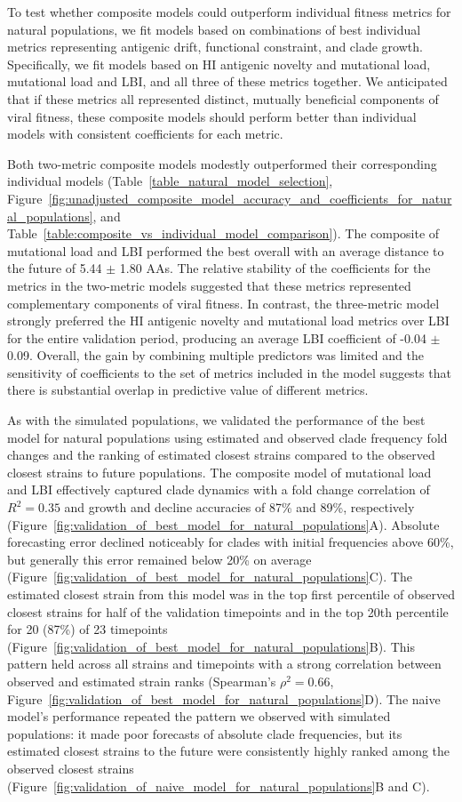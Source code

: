 To test whether composite models could outperform individual fitness metrics for natural populations, we fit models based on combinations of best individual metrics representing antigenic drift, functional constraint, and clade growth.
Specifically, we fit models based on HI antigenic novelty and mutational load, mutational load and LBI, and all three of these metrics together.
We anticipated that if these metrics all represented distinct, mutually beneficial components of viral fitness, these composite models should perform better than individual models with consistent coefficients for each metric.

Both two-metric composite models modestly outperformed their corresponding individual models (Table~\ref{table_natural_model_selection}, Figure~\ref{fig:unadjusted_composite_model_accuracy_and_coefficients_for_natural_populations}, and Table~\ref{table:composite_vs_individual_model_comparison}).
The composite of mutational load and LBI performed the best overall with an average distance to the future of 5.44 $\pm$ 1.80 AAs.
The relative stability of the coefficients for the metrics in the two-metric models suggested that these metrics represented complementary components of viral fitness.
In contrast, the three-metric model strongly preferred the HI antigenic novelty and mutational load metrics over LBI for the entire validation period, producing an average LBI coefficient of -0.04 $\pm$ 0.09.
Overall, the gain by combining multiple predictors was limited and the sensitivity of coefficients to the set of metrics included in the model suggests that there is substantial overlap in predictive value of different metrics.

As with the simulated populations, we validated the performance of the best model for natural populations using estimated and observed clade frequency fold changes and the ranking of estimated closest strains compared to the observed closest strains to future populations.
The composite model of mutational load and LBI effectively captured clade dynamics with a fold change correlation of $R^2 = 0.35$ and growth and decline accuracies of 87\% and 89\%, respectively (Figure~\ref{fig:validation_of_best_model_for_natural_populations}A).
Absolute forecasting error declined noticeably for clades with initial frequencies above 60\%, but generally this error remained below 20\% on average (Figure~\ref{fig:validation_of_best_model_for_natural_populations}C).
The estimated closest strain from this model was in the top first percentile of observed closest strains for half of the validation timepoints and in the top 20th percentile for 20 (87\%) of 23 timepoints (Figure~\ref{fig:validation_of_best_model_for_natural_populations}B).
This pattern held across all strains and timepoints with a strong correlation between observed and estimated strain ranks (Spearman's $\rho^2 = 0.66$, Figure~\ref{fig:validation_of_best_model_for_natural_populations}D).
The naive model's performance repeated the pattern we observed with simulated populations: it made poor forecasts of absolute clade frequencies, but its estimated closest strains to the future were consistently highly ranked among the observed closest strains (Figure~\ref{fig:validation_of_naive_model_for_natural_populations}B and C).


